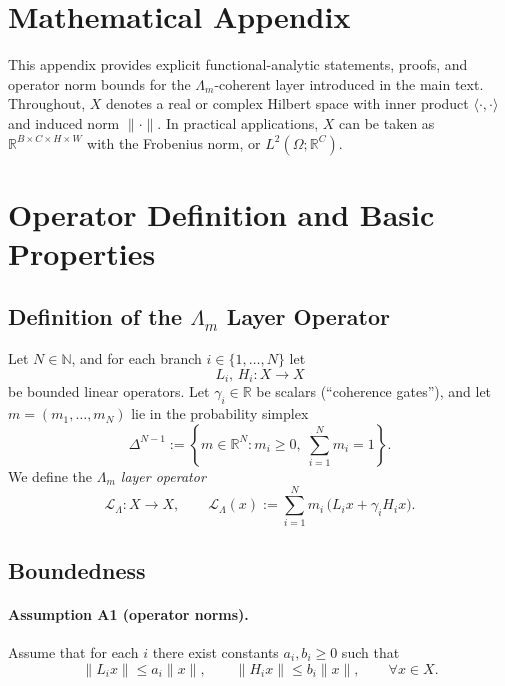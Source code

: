 \documentclass[11pt]{article}
\begin{document}
\appendix
\section*{Mathematical Appendix}

This appendix provides explicit functional-analytic statements, proofs, and operator norm bounds for the $\Lambda_m$-coherent layer introduced in the main text. Throughout, $X$ denotes a real or complex Hilbert space with inner product $\langle\cdot,\cdot\rangle$ and induced norm $\|\cdot\|$. In practical applications, $X$ can be taken as $\mathbb{R}^{B\times C\times H\times W}$ with the Frobenius norm, or $L^2(\Omega;\mathbb{R}^C)$.

\section{Operator Definition and Basic Properties}

\subsection{Definition of the \texorpdfstring{$\Lambda_m$}{} Layer Operator}

Let $N\in\mathbb{N}$, and for each branch $i\in\{1,\dots,N\}$ let
\[
  L_i,\,H_i : X \to X
\]
be bounded linear operators. Let $\gamma_i\in\mathbb{R}$ be scalars (``coherence gates''), and let $m=(m_1,\dots,m_N)$ lie in the probability simplex
\[
  \Delta^{N-1} := \left\{m\in\mathbb{R}^N : m_i\ge 0,\; \sum_{i=1}^N m_i = 1\right\}.
\]
We define the \emph{$\Lambda_m$ layer operator}
\begin{equation}
  \mathcal{L}_\Lambda : X \to X, \qquad
  \mathcal{L}_\Lambda(x)
  := \sum_{i=1}^N m_i\,\bigl(L_i x + \gamma_i H_i x\bigr).
  \label{eq:LambdaLayerDef}
\end{equation}

\subsection{Boundedness}

\paragraph{Assumption A1 (operator norms).}
Assume that for each $i$ there exist constants $a_i,b_i\ge 0$ such that
\begin{equation}
  \|L_i x\|\le a_i\|x\|,\qquad \|H_i x\|\le b_i\|x\|,\qquad \forall x\in X.
  \label{eq:A1}
\end{equation}
\end{document}
